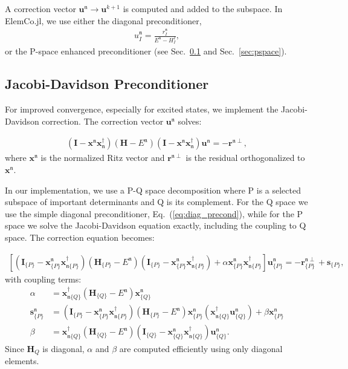 \documentclass[a4paper,12pt,oneside]{book}
\newcommand{\beq}{\begin{equation}\begin{aligned}}
\newcommand{\eeq}{\end{aligned}\end{equation}}
\newcommand{\mat}{\mathbf}
\newcommand{\vect}{\mathbf}
\newcommand{\eq}[1]{Eq.~(\ref{#1})}
\newcommand{\sect}[1]{Sec.~\ref{#1}}
\newcommand{\st}[1]{\mathfrak{#1}}
\newcommand{\elemcoil}{\textsf{ElemCo.jl}}
\begin{document}
A correction vector $\vect{u}^{\st{n}} \rightarrow \vect{u}^{k+1}$ is computed and added to the subspace. 
In \elemcoil, we use either the diagonal preconditioner,
\beq
u^\st{n}_{I} = \frac{r^\st{n}_{I}}{E^\st{n} - H_{I}^{I}},
\label{eq:diag_precond}
\eeq
or the P-space enhanced preconditioner (see \sect{sec:jacobi_davidson} and \sect{sec:pspace}).
\subsection{Jacobi-Davidson Preconditioner}
\label{sec:jacobi_davidson}

For improved convergence, especially for excited states, we implement the Jacobi-Davidson 
correction. The correction vector $\vect{u}^{\st{n}}$ solves:

\beq
(\mat{I} - \vect{x}^{\st{n}} \vect{x}_\st{n}^\dagger)(\mat{H} - E^\st{n})
(\mat{I} - \vect{x}^\st{n} \vect{x}_\st{n}^\dagger) \vect{u}^\st{n} 
= -\vect{r}^{\st{n}\perp},
\eeq
where $\vect{x}^{\st{n}}$ is the normalized Ritz vector and $\vect{r}^{\st{n}\perp}$ is the residual 
orthogonalized to $\vect{x}^{\st{n}}$.

In our implementation, we use a P-Q space decomposition where P is a selected subspace 
of important determinants and Q is its complement. For the Q space we use the simple diagonal preconditioner, \eq{eq:diag_precond}, 
while for the P space we solve the Jacobi-Davidson equation exactly, including the coupling to Q space.
The correction equation becomes:

\beq
\left[(\mat{I}_{\{P\}} - \vect{x}^\st{n}_{\{P\}} \vect{x}_{\st{n}\{P\}}^\dagger)(\mat{H}_{\{P\}} - E^\st{n})
(\mat{I}_{\{P\}} - \vect{x}^\st{n}_{\{P\}} \vect{x}_{\st{n}\{P\}}^\dagger) 
+ \alpha \vect{x}^\st{n}_{\{P\}} \vect{x}_{\st{n}\{P\}}^\dagger\right] \vect{u}^\st{n}_{\{P\}} = -\vect{r}_{\{P\}}^{\st{n}\perp} + \vect{s}_{\{P\}},
\eeq
with coupling terms:
\begin{align}
\alpha &= \vect{x}_{\st{n}\{Q\}}^\dagger (\mat{H}_{\{Q\}} - E^\st{n}) \vect{x}^{\st{n}}_{\{Q\}} \\
\vect{s}^\st{n}_{\{P\}} &= (\mat{I}_{\{P\}} - \vect{x}^\st{n}_{\{P\}} \vect{x}_{\st{n}\{P\}}^\dagger)
\left(\mat{H}_{\{P\}} - E^\st{n}\right)\vect{x}^\st{n}_{\{P\}}
  \left(\vect{x}_{\st{n}\{Q\}}^\dagger \vect{u}^{\st{n}}_{\{Q\}}\right) + \beta \vect{x}^\st{n}_{\{P\}} \\
\beta &= \vect{x}_{\st{n}\{Q\}}^\dagger(\mat{H}_{\{Q\}} - E^\st{n})
(\mat{I}_{\{Q\}} - \vect{x}^\st{n}_{\{Q\}} \vect{x}_{\st{n}\{Q\}}^\dagger)\vect{u}^\st{n}_{\{Q\}}.
\end{align}
Since $\mat{H}_{Q}$ is diagonal, $\alpha$ and $\beta$ are computed efficiently using only 
diagonal elements.
\end{document}
